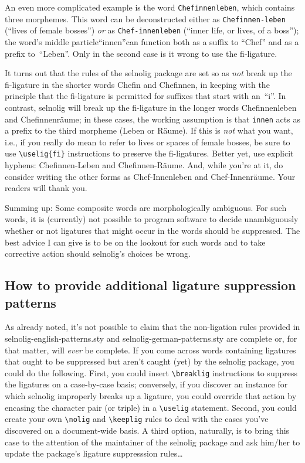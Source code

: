 \documentclass[11pt]{article}
\newcommand{\pkg}[1]{\textsf{#1}}
\newcommand{\opt}[1]{\texttt{#1}}
\newcommand{\cmmd}[1]{\texttt{\textbackslash #1}}
\begin{document}
An even more complicated example is the word \opt{Chefinnenleben}, which contains three morphemes. This word can be deconstructed either as \opt{Chefinnen-leben} (\enquote{lives of female bosses}) \emph{or} as \opt{Chef-innenleben} (\enquote{inner life, or lives, of a boss}); the word's middle particle\textemdash\enquote{innen}\textemdash can function both as a suffix to \enquote{Chef} and as a prefix to~\enquote{Leben}. Only in the second case is it wrong to use the fi-ligature. 

It turns out that the rules of the \pkg{selnolig} package are set so as \emph{not} break up the fi-ligature in the shorter words Chefin and Chefinnen, in keeping with the principle that the fi-ligature is permitted for suffixes that start with an~\enquote{i}. In contrast, \pkg{selnolig} will break up the fi-ligature in the longer words Chefinnenleben and Chefinnenräume; in these cases, the working assumption is that \opt{innen} acts as a prefix to the third morpheme (Leben or Räume). If this is \emph{not} what you want, i.e., if you really do mean to refer to lives or spaces of female bosses, be sure to use \Verb+\uselig{fi}+ instructions to preserve the fi-ligatures. Better yet, use explicit hyphens: Chefinnen-Leben and Chefinnen-Räume. And, while you're at it, do consider writing the other forms as Chef-Innenleben and Chef-Innenräume. Your readers will thank you.

\enlargethispage{0.8\baselineskip}

Summing up: Some composite words are morphologically ambiguous. For such words, it is (currently) not possible to program software to decide unambiguously whether or not ligatures that might occur in the words should be suppressed. The best advice I can give is to be on the lookout for such words and to take corrective action should \pkg{selnolig}'s choices be wrong.



\subsection{How to provide additional ligature suppression patterns}

As already noted, it's not possible to claim that the non-ligation rules provided in \pkg{selnolig-english-patterns.sty} and \pkg{selnolig-german-patterns.sty} are complete or, for that matter, will \emph{ever} be complete. If you come across words containing ligatures that ought to be suppressed but aren't caught (yet) by the \pkg{selnolig} package, you could do the following. First, you could insert \cmmd{breaklig} instructions to suppress the ligatures on a case-by-case basis; conversely, if you discover an instance for which \pkg{selnolig} improperly breaks up a ligature, you could override that action by encasing the character pair (or triple) in a \cmmd{uselig} statement. Second, you could create your own \cmmd{nolig} and \cmmd{keeplig} rules to deal with the cases you've discovered on a document-wide basis. A third option, naturally, is to bring this case to the attention of the maintainer of the \pkg{selnolig} package and ask him/her to update the package's ligature suppresssion rules\dots
\end{document}
